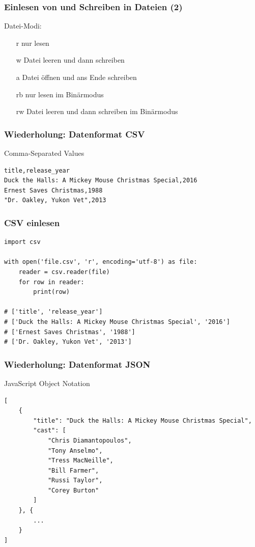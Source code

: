 \begin{frame}[fragile]
	\frametitle{Einlesen von und Schreiben in Dateien (2)}
	
	Datei-Modi:
	
	\begin{itemize}
		\item[\alert{r}] nur lesen
		\item[\alert{w}] Datei leeren und dann schreiben
		\item[\alert{a}] Datei öffnen und ans Ende schreiben
		\item[\alert{rb}] nur lesen im Binärmodus
		\item[\alert{rw}] Datei leeren und dann schreiben im Binärmodus
	\end{itemize}
\end{frame}

\begin{frame}[fragile]
	\frametitle{Wiederholung: Datenformat CSV}
	
	\alert{C}omma-\alert{S}eparated \alert{V}alues
	
	\begin{lstlisting}
title,release_year
Duck the Halls: A Mickey Mouse Christmas Special,2016
Ernest Saves Christmas,1988
"Dr. Oakley, Yukon Vet",2013\end{lstlisting}
\end{frame}

\begin{frame}[fragile]
	\frametitle{CSV einlesen}
	
	\begin{lstlisting}
import csv

with open('file.csv', 'r', encoding='utf-8') as file:
    reader = csv.reader(file)
    for row in reader:
        print(row)
    
# ['title', 'release_year']
# ['Duck the Halls: A Mickey Mouse Christmas Special', '2016']
# ['Ernest Saves Christmas', '1988']
# ['Dr. Oakley, Yukon Vet', '2013']\end{lstlisting}
\end{frame}

\begin{frame}[fragile]
	\frametitle{Wiederholung: Datenformat JSON}
	
	\alert{J}ava\alert{S}cript \alert{O}bject \alert{N}otation
	
	\begin{lstlisting}[basicstyle=\tiny\ttfamily]
[
    {
        "title": "Duck the Halls: A Mickey Mouse Christmas Special",
        "cast": [
            "Chris Diamantopoulos",
            "Tony Anselmo",
            "Tress MacNeille",
            "Bill Farmer",
            "Russi Taylor",
            "Corey Burton"
        ]
    }, {
        ...
    }
]\end{lstlisting}
\end{frame}

